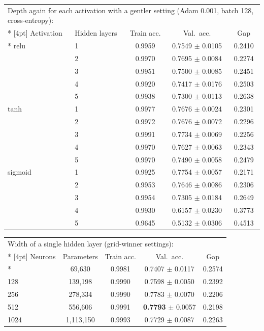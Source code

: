 \documentclass[12pt,a4paper]{article}
\begin{document}
{\small\setlength{\tabcolsep}{4pt}
\begin{longtable}{llccc}
\multicolumn{5}{l}{\parbox[t]{14.5cm}{Depth again for each activation with a gentler setting (Adam 0.001, batch 128, cross-entropy):}} \\*
[4pt]
\toprule
Activation & Hidden layers & Train acc. & Val.\ acc. & Gap \\*
\midrule
relu & 1 & 0.9959 & 0.7549 $\pm$ 0.0105 & 0.2410 \\
 & 2 & 0.9970 & 0.7695 $\pm$ 0.0084 & 0.2274 \\
 & 3 & 0.9951 & 0.7500 $\pm$ 0.0085 & 0.2451 \\
 & 4 & 0.9920 & 0.7417 $\pm$ 0.0176 & 0.2503 \\
 & 5 & 0.9938 & 0.7300 $\pm$ 0.0113 & 0.2638 \\
tanh & 1 & 0.9977 & 0.7676 $\pm$ 0.0024 & 0.2301 \\
 & 2 & 0.9972 & 0.7676 $\pm$ 0.0072 & 0.2296 \\
 & 3 & 0.9991 & 0.7734 $\pm$ 0.0069 & 0.2256 \\
 & 4 & 0.9970 & 0.7627 $\pm$ 0.0063 & 0.2343 \\
 & 5 & 0.9970 & 0.7490 $\pm$ 0.0058 & 0.2479 \\
sigmoid & 1 & 0.9925 & 0.7754 $\pm$ 0.0057 & 0.2171 \\
 & 2 & 0.9953 & 0.7646 $\pm$ 0.0086 & 0.2306 \\
 & 3 & 0.9954 & 0.7305 $\pm$ 0.0184 & 0.2649 \\
 & 4 & 0.9930 & 0.6157 $\pm$ 0.0230 & 0.3773 \\
 & 5 & 0.9645 & 0.5132 $\pm$ 0.0306 & 0.4513 \\
\bottomrule
\end{longtable}
}

{\small\setlength{\tabcolsep}{4pt}
\begin{longtable}{lcccc}
\multicolumn{5}{l}{\parbox[t]{14.5cm}{Width of a single hidden layer (grid-winner settings):}} \\*
[4pt]
\toprule
Neurons & Parameters & Train acc. & Val.\ acc. & Gap \\*
\midrule
64 & 69{,}630 & 0.9981 & 0.7407 $\pm$ 0.0117 & 0.2574 \\
128 & 139{,}198 & 0.9990 & 0.7598 $\pm$ 0.0050 & 0.2392 \\
256 & 278{,}334 & 0.9990 & 0.7783 $\pm$ 0.0070 & 0.2206 \\
512 & 556{,}606 & 0.9991 & \textbf{0.7793} $\pm$ 0.0057 & 0.2198 \\
1024 & 1{,}113{,}150 & 0.9993 & 0.7729 $\pm$ 0.0087 & 0.2263 \\
\bottomrule
\end{longtable}
}
\end{document}
